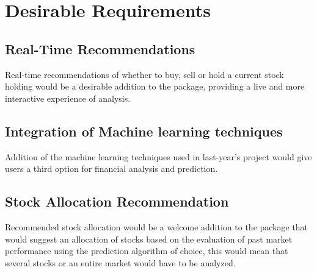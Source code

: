 \section{Desirable Requirements}
\label{section: desirable_req}

\subsection{Real-Time Recommendations} 
Real-time recommendations of whether to buy, sell or hold a current stock holding would be a desirable addition to the package, providing a live and more interactive experience of analysis.

\subsection{Integration of Machine learning techniques} 
Addition of the machine learning techniques used in last-year's project would give users a third option for financial analysis and prediction.

\subsection {Stock Allocation Recommendation}
Recommended stock allocation would be a welcome addition to the package that would suggest an allocation of stocks based on the evaluation of past market performance using the prediction algorithm of choice, this would mean that several stocks or an entire market would have to be analyzed. 





